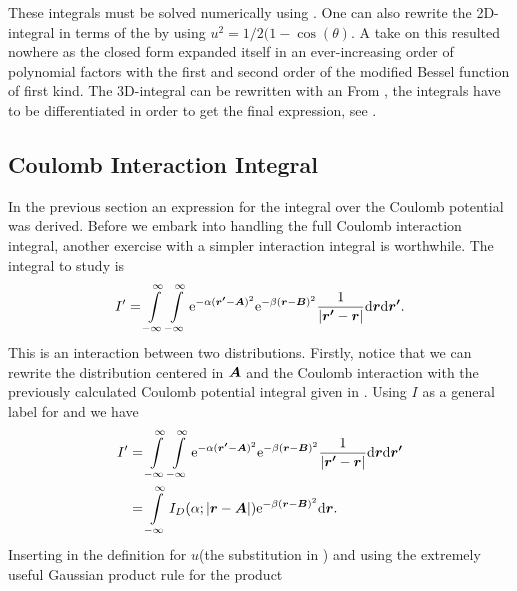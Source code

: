     These integrals must be solved numerically using \cite{gausschebyshev}. One can also rewrite the 2D-integral in
    terms of the  by using
    $u^2=1/2(1 - \cos(\theta)$\cite{modifiedBessel}. A take on this resulted
    nowhere as the closed form expanded itself in an ever-increasing order of
    polynomial factors with the first and second order of the modified Bessel
    function of first kind.  The 3D-integral can be rewritten with an
     From , the
    integrals have to be differentiated in order to get the final expression,
    see .

\subsection{Coulomb Interaction Integral}
    In the previous section an expression for the integral over the Coulomb
    potential was derived. Before we embark into handling the full Coulomb
    interaction integral, another exercise with a simpler interaction integral is
    worthwhile. The integral to study is
        \begin{equation}
            I' = \int\limits^{\infty}_{-\infty}\int\limits^{\infty}_{-\infty} \mathrm{e}^{-\alpha(\boldsymbol{{r'}}-\boldsymbol{{A}})^2}
            \mathrm{e}^{-\beta(\boldsymbol{{r}}-\boldsymbol{{B}})^2} \frac{1}{\abs{\boldsymbol{{r'}} -
            \boldsymbol{{r}}}} \mathrm{d}\boldsymbol{{r}} \mathrm{d}\boldsymbol{{r'}}.
            \label{eq:coulombInteractionSimple}
        \end{equation}
    This is an interaction between two distributions. Firstly, notice that we
    can rewrite the distribution centered in $\boldsymbol{{A}}$ and the Coulomb
    interaction with the previously calculated Coulomb potential integral given
    in . Using $I$ as a general label for
     and  we have
        \begin{align}
            I' &= \int\limits^{\infty}_{-\infty}\int\limits^{\infty}_{-\infty} \mathrm{e}^{-\alpha(\boldsymbol{{r'}}-\boldsymbol{{A}})^2}
            \mathrm{e}^{-\beta(\boldsymbol{{r}}-\boldsymbol{{B}})^2} \frac{1}{\abs{\boldsymbol{{r'}} -
            \boldsymbol{{r}}}} \mathrm{d}\boldsymbol{{r}} \mathrm{d}\boldsymbol{{r'}} \nonumber \\
            &= \int\limits^{\infty}_{-\infty} I_D(\alpha;\abs{\boldsymbol{{r}}-\boldsymbol{{A}}}) \mathrm{e}^{-\beta(\boldsymbol{{r}}
            - \boldsymbol{{B}})^2} \mathrm{d}\boldsymbol{{r}}.
            \label{eq:Cintr1}
        \end{align}
    Inserting in the definition for $u$(the substitution in )
    and using the extremely useful Gaussian product rule for the product
